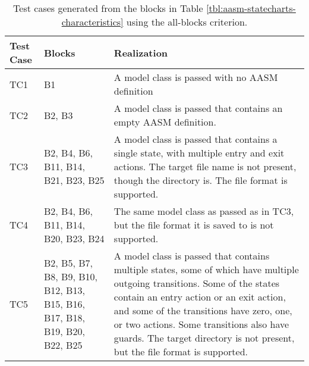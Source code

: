 \documentclass[document.tex]{subfiles}
\begin{document}
\begin{table}[!htbp]
  \centering
  \caption{Test cases generated from the blocks in Table \ref{tbl:aasm-statecharts-characteristics} using the all-blocks criterion.}
  \label{tbl:aasm-statecharts-cases}

  \renewcommand{\arraystretch}{1.2}
  \vspace{3mm}
  \begin{tabular}{l p{4cm} p{8cm}}
    \toprule
    Test Case & Blocks & Realization \\
    \midrule
    TC1 & B1 & A model class is passed with no AASM definition \\
    TC2 & B2, B3 & A model class is passed that contains an empty AASM definition. \\
    TC3 & B2, B4, B6, B11, B14, B21, B23, B25 & A model class is passed that contains a single state, with multiple entry and exit actions. The target file name is not present, though the directory is. The file format is supported. \\
    TC4 & B2, B4, B6, B11, B14, B20, B23, B24 & The same model class as passed as in TC3, but the file format it is saved to is not supported. \\
    TC5 & B2, B5, B7, B8, B9, B10, B12, B13, B15, B16, B17, B18, B19, B20, B22, B25 & A model class is passed that contains multiple states, some of which have multiple outgoing transitions. Some of the states contain an entry action or an exit action, and some of the transitions have zero, one, or two actions. Some transitions also have guards. The target directory is not present, but the file format is supported.
\\
    \bottomrule
  \end{tabular}
\end{table}


\FloatBarrier
\end{document}
